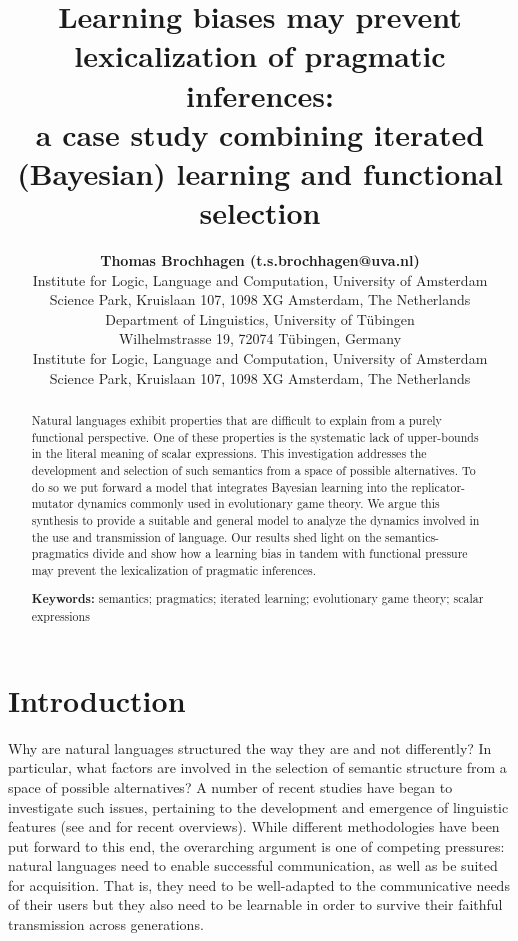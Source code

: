 \documentclass[10pt,a4paper]{article}
\title{Learning biases may prevent lexicalization of pragmatic inferences:\\ a case study combining iterated (Bayesian) learning and functional selection}
\author{{\large \bf Thomas Brochhagen (t.s.brochhagen@uva.nl)} \\
  Institute for Logic, Language and Computation, University of Amsterdam\\
  Science Park, Kruislaan 107, 1098 XG Amsterdam, The Netherlands
  \AND {\large \bf Michael Franke  (mchfranke@gmail.com)} \\
  Department of Linguistics, University of T\"ubingen\\
 Wilhelmstrasse 19, 72074 T\"ubingen, Germany 
    \AND {\large \bf Robert van Rooij (r.a.m.vanRooij@uva.nl)} \\
  Institute for Logic, Language and Computation, University of Amsterdam\\
Science Park, Kruislaan 107, 1098 XG Amsterdam, The Netherlands}
\begin{document}
\maketitle


\begin{abstract}
Natural languages exhibit properties that are difficult to explain from a purely functional perspective. One of these properties is the systematic lack of upper-bounds in the literal meaning of scalar expressions. This investigation addresses the development and selection of such semantics from a space of possible alternatives. To do so we put forward a model that integrates Bayesian learning into the replicator-mutator dynamics commonly used in evolutionary game theory. We argue this synthesis to provide a suitable and general model to analyze the dynamics involved in the use and transmission of language. Our results shed light on the semantics-pragmatics divide and show how a learning bias in tandem with functional pressure may prevent the lexicalization of pragmatic inferences.

\textbf{Keywords:} 
semantics; pragmatics; iterated learning; evolutionary game theory; scalar expressions
\end{abstract}


\section{Introduction}
Why are natural languages structured the way they are and not differently? In particular, what factors are involved in the selection of semantic structure from a space of possible alternatives? A number of recent studies have began to investigate such issues, pertaining to the development and emergence of linguistic features (see \citealt{steels:2015} and \citealt{tamariz+kirby:2016} for recent overviews). While different methodologies have been put forward to this end, the overarching argument is one of competing pressures: natural languages need to enable successful communication, as well as be suited for acquisition. That is, they need to be well-adapted to the communicative needs of their users but they also need to be learnable in order to survive their faithful transmission across generations. 
\end{document}
